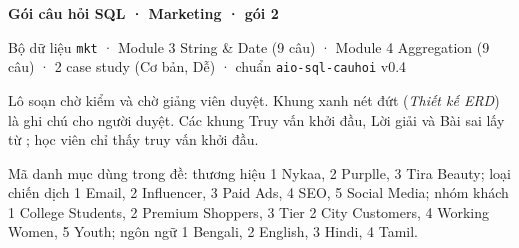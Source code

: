 \documentclass[11pt,a4paper]{article}
\begin{document}
{\LARGE\bfseries Gói câu hỏi SQL · Marketing · gói 2\par}
\medskip
{\color{cqMuted}Bộ dữ liệu \texttt{mkt} · Module 3 String \& Date (9 câu) · Module 4 Aggregation (9 câu) · 2 case study (Cơ bản, Dễ) · chuẩn \texttt{aio-sql-cauhoi} v0.4\par}
\bigskip
Lô soạn chờ kiểm và chờ giảng viên duyệt. Khung xanh nét đứt (\emph{Thiết kế ERD}) là ghi chú cho người duyệt. Các khung Truy vấn khởi đầu, Lời giải và Bài sai lấy từ ; học viên chỉ thấy truy vấn khởi đầu.

Mã danh mục dùng trong đề: thương hiệu  1 Nykaa, 2 Purplle, 3 Tira Beauty; loại chiến dịch  1 Email, 2 Influencer, 3 Paid Ads, 4 SEO, 5 Social Media; nhóm khách  1 College Students, 2 Premium Shoppers, 3 Tier 2 City Customers, 4 Working Women, 5 Youth; ngôn ngữ  1 Bengali, 2 English, 3 Hindi, 4 Tamil.

\tableofcontents


\end{document}
